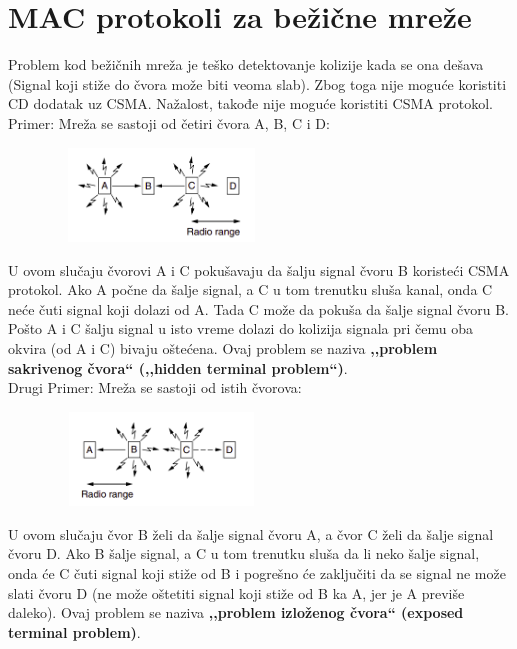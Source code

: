 \documentclass[a4paper]{article}
\begin{document}
\section{MAC protokoli za bežične mreže}
    Problem kod bežičnih mreža je teško detektovanje kolizije kada se ona dešava (Signal koji
    stiže do čvora može biti veoma slab). Zbog toga nije moguće koristiti CD dodatak uz CSMA.
    Nažalost, takođe nije moguće koristiti CSMA protokol. Primer: Mreža se sastoji od četiri
    čvora A, B, C i D: 
    \begin{figure}[H]
        \begin{center}
            \includegraphics[width=60mm,height=25mm]{Slike/abcd1.png}
        \end{center}
    \end{figure}
    U ovom slučaju čvorovi A i C pokušavaju da šalju signal čvoru B koristeći CSMA protokol. Ako 
    A počne da šalje signal, a C u tom trenutku sluša kanal, onda C neće čuti signal koji dolazi
    od A. Tada C može da pokuša da šalje signal čvoru B. Pošto A i C šalju signal u isto vreme
    dolazi do kolizija signala pri čemu oba okvira (od A i C) bivaju oštećena. Ovaj problem se 
    naziva \textbf{,,problem sakrivenog čvora`` (,,hidden terminal problem``)}. \\
    \indent Drugi Primer: Mreža se sastoji od istih čvorova:
    \begin{figure}[H]
        \begin{center}
            \includegraphics[width=60mm,height=25mm]{Slike/abcd2.png}
        \end{center}
    \end{figure}
    U ovom slučaju čvor B želi da šalje signal čvoru A, a čvor C želi da šalje signal čvoru D. Ako
    B šalje signal, a C u tom trenutku sluša da li neko šalje signal, onda će C čuti signal
    koji stiže od B i pogrešno će zaključiti da se signal ne može slati čvoru D (ne može oštetiti
    signal koji stiže od B ka A, jer je A previše daleko). Ovaj problem se naziva \textbf{,,problem 
    izloženog čvora`` (exposed terminal problem)}.\\
\end{document}
